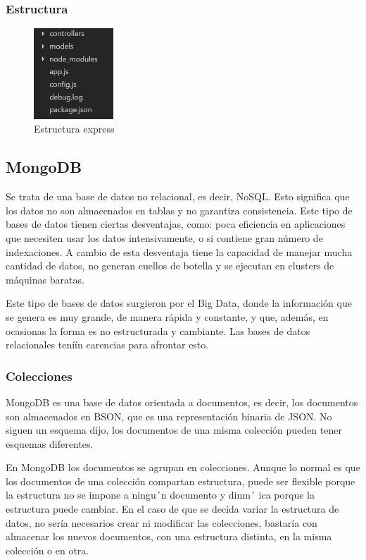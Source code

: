 \documentclass[a4paper, 12pt]{book}
\begin{document}
\subsubsection{Estructura}
\label{subsec:estilo}

\begin{figure}[H]
  \centering
  \includegraphics[width=3cm, keepaspectratio]{img/estructura_express}
  \caption{Estructura express}
  \label{figura:estructura_express}
\end{figure}


\subsection{MongoDB}
\label{subsec:estilo}

Se trata de una base de datos no relacional, es decir, NoSQL. Esto significa que los datos no
son almacenados en tablas y no garantiza consistencia. Este tipo de bases de datos tienen ciertas
desventajas, como: poca eficiencia en aplicaciones que necesiten usar los datos intensivamente,
o si contiene gran n\'umero de indexaciones. A cambio de esta desventaja tiene la capacidad de
manejar mucha cantidad de datos, no generan cuellos de botella y se ejecutan en clusters de
m\'aquinas baratas.

Este tipo de bases de datos surgieron por el Big Data, donde la informaci\'on que se genera
es muy grande, de manera r\'apida y constante, y que, adem\'as, en ocasionas la forma es no
estructurada y cambiante. Las bases de datos relacionales ten\'i\'in carencias para afrontar esto.

\subsubsection{Colecciones}
\label{subsec:estilo}

MongoDB es una base de datos orientada a documentos, es decir, los documentos son almacenados
en BSON, que es una representaci\'on binaria de JSON. No siguen un esquema dijo,
los documentos de una misma colecci\'on pueden tener esquemas diferentes.

En MongoDB los documentos se agrupan en colecciones. Aunque lo normal es que los documentos
de una colecci\'on compartan estructura, puede ser flexible porque la estructura no se
impone a ningu´n documento y dinm´ ica porque la estructura puede cambiar. En el caso de que se
decida variar la estructura de datos, no ser\'ia necesarios crear ni modificar las colecciones, bastar\'ia con almacenar los nuevos documentos, con una estructura distinta, en la misma colecci\'on
o en otra.
\end{document}
